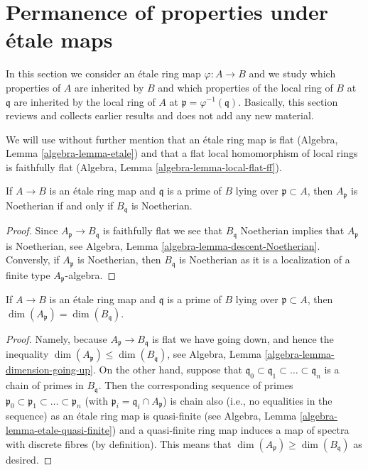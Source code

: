 \section{Permanence of properties under \'etale maps}
\label{section-permanence-etale}

\noindent
In this section we consider an \'etale ring map $\varphi : A \to B$
and we study which properties of $A$ are inherited by $B$
and which properties of the local ring of $B$ at $\mathfrak q$
are inherited by the local ring of $A$ at
$\mathfrak p = \varphi^{-1}(\mathfrak q)$.
Basically, this section reviews and collects earlier results
and does not add any new material.

\medskip\noindent
We will use without further mention that an \'etale ring map
is flat (Algebra, Lemma \ref{algebra-lemma-etale}) and that a
flat local homomorphism of local rings is faithfully flat
(Algebra, Lemma \ref{algebra-lemma-local-flat-ff}).

\begin{lemma}
\label{lemma-Noetherian-etale-extension}
If $A \to B$ is an \'etale ring map and $\mathfrak q$ is a prime of
$B$ lying over $\mathfrak p \subset A$, then
$A_{\mathfrak p}$ is Noetherian if and only if $B_{\mathfrak q}$ is
Noetherian.
\end{lemma}

\begin{proof}
Since $A_\mathfrak p \to B_\mathfrak q$ is faithfully flat
we see that $B_\mathfrak q$ Noetherian implies that $A_\mathfrak p$
is Noetherian, see
Algebra, Lemma \ref{algebra-lemma-descent-Noetherian}.
Conversly, if $A_\mathfrak p$ is Noetherian, then $B_\mathfrak q$
is Noetherian as it is a localization of a finite type
$A_\mathfrak p$-algebra.
\end{proof}

\begin{lemma}
\label{lemma-dimension-etale-extension}
If $A \to B$ is an \'etale ring map and $\mathfrak q$ is a prime of
$B$ lying over $\mathfrak p \subset A$, then
$\dim(A_{\mathfrak p}) = \dim(B_{\mathfrak q})$.
\end{lemma}

\begin{proof}
Namely, because $A_{\mathfrak p} \to B_{\mathfrak q}$ is flat we have
going down, and hence the inequality
$\dim(A_{\mathfrak p}) \leq \dim(B_{\mathfrak q})$, see
Algebra, Lemma \ref{algebra-lemma-dimension-going-up}.
On the other hand, suppose that
$\mathfrak q_0 \subset \mathfrak q_1 \subset \ldots \subset \mathfrak q_n$
is a chain of primes in $B_{\mathfrak q}$. Then the corresponding
sequence of primes
$\mathfrak p_0 \subset \mathfrak p_1 \subset \ldots \subset \mathfrak p_n$
(with $\mathfrak p_i = \mathfrak q_i \cap A_{\mathfrak p}$) is chain
also (i.e., no equalities in the sequence) as an
\'etale ring map is quasi-finite (see
Algebra, Lemma \ref{algebra-lemma-etale-quasi-finite})
and a quasi-finite ring map induces a map of spectra with
discrete fibres (by definition).
This means that $\dim(A_{\mathfrak p}) \geq \dim(B_{\mathfrak q})$ as
desired.
\end{proof}

